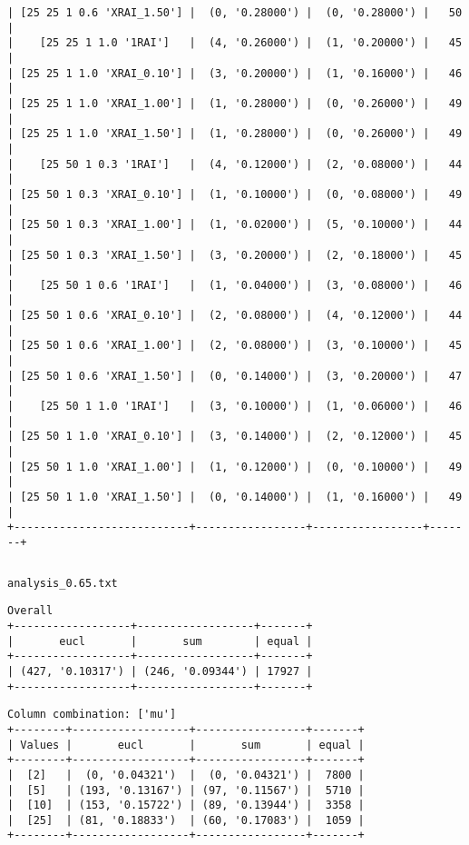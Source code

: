 \documentclass{article}
\begin{document}
\begin{verbatim}
| [25 25 1 0.6 'XRAI_1.50'] |  (0, '0.28000') |  (0, '0.28000') |   50  |
|    [25 25 1 1.0 '1RAI']   |  (4, '0.26000') |  (1, '0.20000') |   45  |
| [25 25 1 1.0 'XRAI_0.10'] |  (3, '0.20000') |  (1, '0.16000') |   46  |
| [25 25 1 1.0 'XRAI_1.00'] |  (1, '0.28000') |  (0, '0.26000') |   49  |
| [25 25 1 1.0 'XRAI_1.50'] |  (1, '0.28000') |  (0, '0.26000') |   49  |
|    [25 50 1 0.3 '1RAI']   |  (4, '0.12000') |  (2, '0.08000') |   44  |
| [25 50 1 0.3 'XRAI_0.10'] |  (1, '0.10000') |  (0, '0.08000') |   49  |
| [25 50 1 0.3 'XRAI_1.00'] |  (1, '0.02000') |  (5, '0.10000') |   44  |
| [25 50 1 0.3 'XRAI_1.50'] |  (3, '0.20000') |  (2, '0.18000') |   45  |
|    [25 50 1 0.6 '1RAI']   |  (1, '0.04000') |  (3, '0.08000') |   46  |
| [25 50 1 0.6 'XRAI_0.10'] |  (2, '0.08000') |  (4, '0.12000') |   44  |
| [25 50 1 0.6 'XRAI_1.00'] |  (2, '0.08000') |  (3, '0.10000') |   45  |
| [25 50 1 0.6 'XRAI_1.50'] |  (0, '0.14000') |  (3, '0.20000') |   47  |
|    [25 50 1 1.0 '1RAI']   |  (3, '0.10000') |  (1, '0.06000') |   46  |
| [25 50 1 1.0 'XRAI_0.10'] |  (3, '0.14000') |  (2, '0.12000') |   45  |
| [25 50 1 1.0 'XRAI_1.00'] |  (1, '0.12000') |  (0, '0.10000') |   49  |
| [25 50 1 1.0 'XRAI_1.50'] |  (0, '0.14000') |  (1, '0.16000') |   49  |
+---------------------------+-----------------+-----------------+-------+
\end{verbatim}

\begin{verbatim}

\end{verbatim}

\newpage
\verb|analysis_0.65.txt|
\begin{verbatim}
Overall
+------------------+------------------+-------+
|       eucl       |       sum        | equal |
+------------------+------------------+-------+
| (427, '0.10317') | (246, '0.09344') | 17927 |
+------------------+------------------+-------+
\end{verbatim}

\begin{verbatim}
Column combination: ['mu']
+--------+------------------+-----------------+-------+
| Values |       eucl       |       sum       | equal |
+--------+------------------+-----------------+-------+
|  [2]   |  (0, '0.04321')  |  (0, '0.04321') |  7800 |
|  [5]   | (193, '0.13167') | (97, '0.11567') |  5710 |
|  [10]  | (153, '0.15722') | (89, '0.13944') |  3358 |
|  [25]  | (81, '0.18833')  | (60, '0.17083') |  1059 |
+--------+------------------+-----------------+-------+
\end{verbatim}
\end{document}
